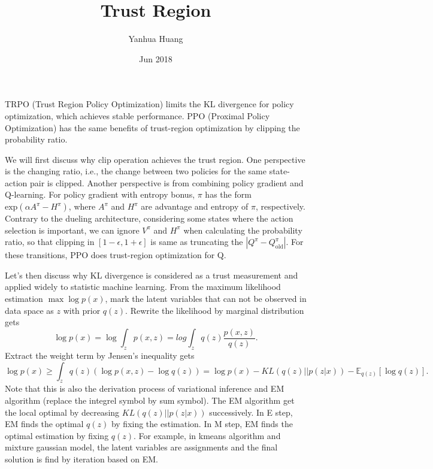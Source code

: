 \documentclass[a4paper,11pt]{article}
\begin{document}
\title{Trust Region}
\author{Yanhua Huang}
\date{Jun 2018}
\maketitle

TRPO (Trust Region Policy Optimization) limits the KL divergence for policy optimization, which achieves stable performance. PPO (Proximal Policy Optimization) has the same benefits of trust-region optimization by clipping the probability ratio.

We will first discuss why clip operation achieves the trust region. One perspective is the changing ratio, i.e., the change between two policies for the same state-action pair is clipped. Another perspective is from combining policy gradient and Q-learning. For policy gradient with entropy bonus, $\pi$ has the form $\text{exp}({\alpha A^\pi - H^\pi})$, where $A^\pi$ and $H^\pi$ are advantage and entropy of $\pi$, respectively. Contrary to the dueling architecture, considering some states where the action selection is important, we can ignore $V^\pi$ and $H^\pi$ when calculating the probability ratio, so that clipping in $[1 - \epsilon, 1 + \epsilon]$ is same as truncating the $|Q^\pi - Q^\pi_\text{old}|$. For these transitions, PPO does trust-region optimization for Q.

Let's then discuss why KL divergence is considered as a trust measurement and applied widely to statistic machine learning. From the maximum likelihood estimation $\max \log p(x)$, mark the latent variables that can not be observed in data space as $z$ with prior $q(z)$. Rewrite the likelihood by marginal distribution gets
\begin{equation}
\log p(x) = \log \int_zp(x, z) = log \int_z q(z) \frac{p(x, z)}{q(z)}.
\end{equation}
Extract the weight term by Jensen's inequality gets 
\begin{equation}
\log p(x) \ge \int_z q(z)(\log p(x, z) - \log q(z)) = \log p(x) - KL(q(z)||p(z|x)) - \mathbb{E}_{q(z)}[\log q(z)].
\end{equation}
Note that this is also the derivation process of variational inference and EM algorithm (replace the integrel symbol by sum symbol). The EM algorithm get the local optimal by decreasing $KL(q(z)||p(z|x))$ successively. In E step, EM finds the optimal $q(z)$ by fixing the estimation. In M step, EM finds the optimal estimation by fixing $q(z)$. For example, in kmeans algorithm and mixture gaussian model, the latent variables are assignments and the final solution is find by iteration based on EM.
\end{document}

